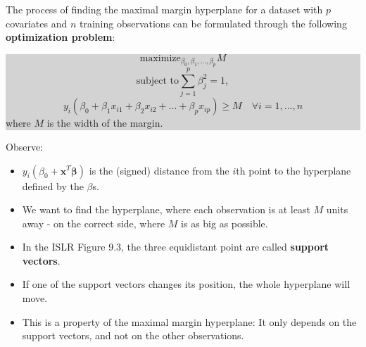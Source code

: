 \documentclass[10pt,ignorenonframetext,]{beamer}
\providecommand{\tightlist}{%
  \setlength{\itemsep}{0pt}\setlength{\parskip}{0pt}}
\begin{document}
\begin{frame}

The process of finding the maximal margin hyperplane for a dataset with
\(p\) covariates and \(n\) training observations can be formulated
through the following \textbf{optimization problem}:

\colorbox{lightgray}{\begin{minipage}{10cm}
$$\mathrm{maximize}_{\beta_0,\beta_1,...,\beta_p}  M $$
$$\text{subject to} \sum_{j=1}^p \beta_j^2=1,$$
$$y_i(\beta_0+\beta_1 x_{i1}+\beta_2 x_{i2}+...+\beta_p x_{ip})\geq M \quad  \forall i=1,...,n$$
where $M$ is the width of the margin. 
\end{minipage}}

Observe: \vspace{-2mm}

\begin{itemize}
\tightlist
\item
  \(y_i(\beta_0+{\boldsymbol x}^T {\boldsymbol \beta})\) is the (signed)
  distance from the \(i\)th point to the hyperplane defined by the
  \(\beta\)s.
\item
  We want to find the hyperplane, where each observation is at least
  \(M\) units away - on the correct side, where \(M\) is as big as
  possible.
\end{itemize}

\end{frame}

\begin{frame}

\begin{itemize}
\item
  In the ISLR Figure 9.3, the three equidistant point are called
  \textbf{support vectors}.
\item
  If one of the support vectors changes its position, the whole
  hyperplane will move.
\item
  This is a property of the maximal margin hyperplane: It only depends
  on the support vectors, and not on the other observations.
\end{itemize}

\end{frame}
\end{document}
